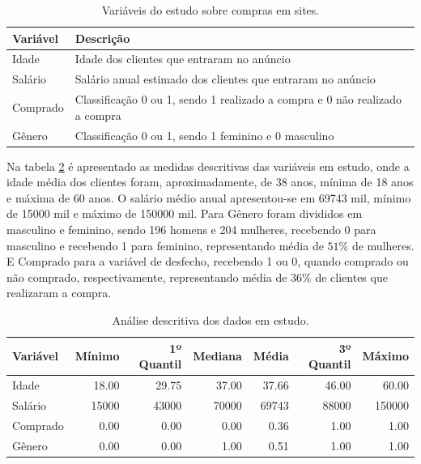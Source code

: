 \documentclass[a4paper]{article}
\begin{document}
\begin{table}[H] 
\caption{Variáveis do estudo sobre compras em sites.}
\begin{center}
\begin{tabular}{ll}
\hline
 Variável & Descrição\\
 \hline
Idade & Idade dos clientes que entraram no anúncio\\
Salário & Salário anual estimado dos clientes que entraram no anúncio\\
Comprado & Classificação 0 ou 1, sendo 1 realizado a compra e 0 não realizado a compra\\
Gênero & Classificação 0 ou 1, sendo 1 feminino e 0 masculino\\
\hline
\end{tabular}
\label{tab1}
\end{center}
\end{table}

Na tabela \ref{tab2} é apresentado as medidas descritivas das variáveis em estudo, onde a idade média dos clientes foram, aproximadamente, de 38 anos, mínima de 18 anos e máxima de 60 anos. O salário médio anual apresentou-se em 69743 mil, mínimo de 15000 mil e máximo de 150000 mil. Para Gênero foram divididos em masculino e feminino, sendo 196 homens e 204 mulheres, recebendo 0 para masculino e recebendo 1 para feminino, representando média de $51\%$  de mulheres. E Comprado para a variável de desfecho, recebendo 1 ou 0, quando comprado ou não comprado, respectivamente, representando média de  $36\%$ de clientes que realizaram a compra.
\begin{table}[H] 
\caption{Análise descritiva dos dados em estudo.}
\begin{center}
\begin{tabular}{lrrrrrr}
\hline
 Variável & Mínimo & 1º Quantil & Mediana & Média & 3º Quantil & Máximo\\
 \hline
Idade & 18.00 & 29.75 & 37.00 & 37.66 & 46.00 & 60.00\\
Salário & 15000 & 43000 & 70000 & 69743 & 88000 & 150000\\
Comprado & 0.00 & 0.00 & 0.00 & 0.36 & 1.00 & 1.00\\
Gênero & 0.00 & 0.00 & 1.00 & 0.51 & 1.00 & 1.00\\
\hline
\end{tabular}

\label{tab2}
\end{center}
\end{table}
\end{document}
